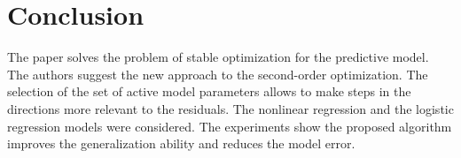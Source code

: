 \documentclass[a4paper,12pt]{article}
\theoremstyle{plain} %
\theoremstyle{definition} %
\theoremstyle{remark} %
\begin{document}
	\section*{Conclusion}
	The paper solves the problem of stable optimization for the predictive model.
	The authors suggest the new approach to the second-order optimization. 
	The selection of the set of active model parameters allows to make steps in the directions more relevant to the residuals.
	The nonlinear regression and the logistic regression models were considered.
	The experiments show the proposed algorithm improves the generalization ability and reduces the model error.
  
  
  
	
\end{document}
